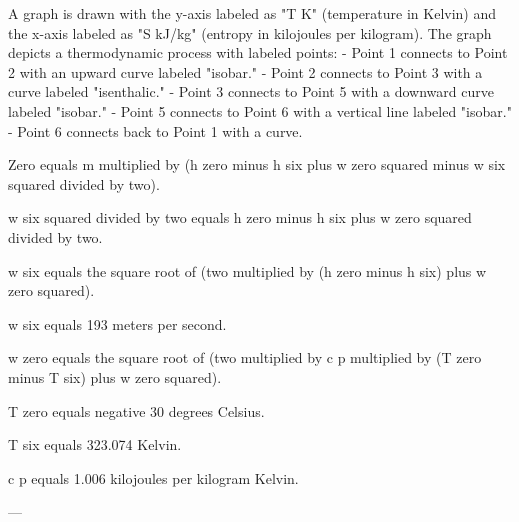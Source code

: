 A graph is drawn with the y-axis labeled as "T K" (temperature in Kelvin) and the x-axis labeled as "S kJ/kg" (entropy in kilojoules per kilogram). The graph depicts a thermodynamic process with labeled points:  
- Point 1 connects to Point 2 with an upward curve labeled "isobar."  
- Point 2 connects to Point 3 with a curve labeled "isenthalic."  
- Point 3 connects to Point 5 with a downward curve labeled "isobar."  
- Point 5 connects to Point 6 with a vertical line labeled "isobar."  
- Point 6 connects back to Point 1 with a curve.

Zero equals m multiplied by (h zero minus h six plus w zero squared minus w six squared divided by two).  

w six squared divided by two equals h zero minus h six plus w zero squared divided by two.  

w six equals the square root of (two multiplied by (h zero minus h six) plus w zero squared).  

w six equals 193 meters per second.  

w zero equals the square root of (two multiplied by c p multiplied by (T zero minus T six) plus w zero squared).  

T zero equals negative 30 degrees Celsius.  

T six equals 323.074 Kelvin.  

c p equals 1.006 kilojoules per kilogram Kelvin.  

---